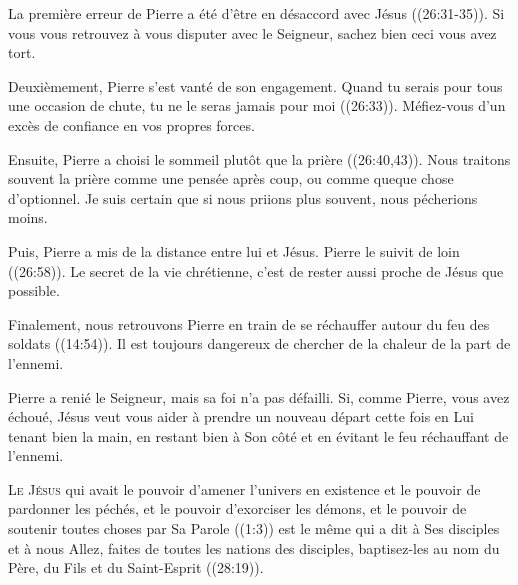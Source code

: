 La première erreur de Pierre a été d'être en désaccord avec Jésus
 ((26:31-35)).
 Si vous vous retrouvez à vous disputer avec le Seigneur,
 sachez bien ceci\frcolon{} vous avez tort. 


Deuxièmement, Pierre s'est vanté de son engagement.
 \Og Quand tu serais pour tous une occasion de chute,
 tu ne le seras jamais pour moi \Fg{} ((26:33)).
 Méfiez-vous d'un excès de confiance en vos propres forces. 

Ensuite, Pierre a choisi le sommeil plutôt que la prière
 ((26:40,43)).
 Nous traitons souvent la prière comme une pensée après coup,
 ou comme queque chose d'optionnel.
 Je suis certain que si nous priions plus souvent, nous pécherions moins. 

Puis, Pierre a mis de la distance entre lui et Jésus.
 \Og Pierre le suivit de loin \Fg{} ((26:58)).
 Le secret de la vie chrétienne, 
 c'est de rester aussi proche de Jésus que possible. 

Finalement, nous retrouvons Pierre en train de se réchauffer
 autour du feu des soldats ((14:54)).
 Il est toujours dangereux de chercher de la chaleur de la part de l'ennemi. 

Pierre a renié le Seigneur, mais sa foi n'a pas défailli.
 Si, comme Pierre, vous avez échoué, Jésus veut vous aider
 à prendre un nouveau départ \ocadr cette fois en Lui tenant bien la main,
 en restant bien à Son côté et en évitant le feu réchauffant de l'ennemi. 

\dvrule






\lettrine{L}{e Jésus} qui avait le pouvoir d'amener l'univers
 en existence et le pouvoir de pardonner les péchés,
 et le pouvoir d'exorciser les démons, et le pouvoir de soutenir
 toutes choses par Sa Parole ((1:3))
 est le même qui a dit à Ses disciples \ocadr et à nous \fcadr{}\frcolon{} 
 \Og Allez, faites de toutes les nations des disciples,
 baptisez-les au nom du Père, du Fils et du Saint-Esprit \Fg{}
 ((28:19)). 

